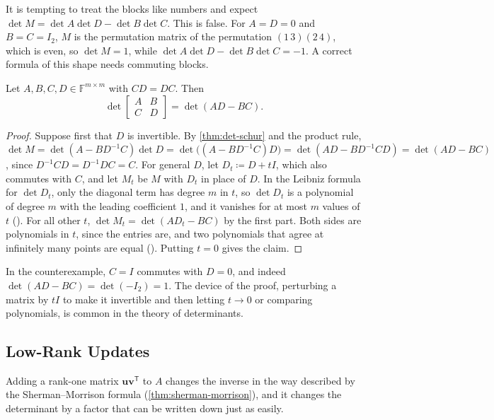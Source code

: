 It is tempting to treat the blocks like numbers and expect $\det M=\det A\det D-\det B\det C$. This is false. For $A=D=0$ and $B=C=I_2$, $M$ is the permutation matrix of the permutation $(1\,3)(2\,4)$, which is even, so $\det M=1$, while $\det A\det D-\det B\det C=-1$. A correct formula of this shape needs commuting blocks.

\begin{proposition}
\label{prop:commuting-blocks}
Let $A,B,C,D\in\mathbb F^{m\times m}$ with $CD=DC$. Then
\[
\det\begin{bmatrix}A&B\\C&D\end{bmatrix}=\det(AD-BC).
\]
\end{proposition}

\begin{proof}
Suppose first that $D$ is invertible. By \cref{thm:det-schur} and the product rule, $\det M=\det(A-BD^{-1}C)\det D=\det\bigl((A-BD^{-1}C)D\bigr)=\det(AD-BD^{-1}CD)=\det(AD-BC)$, since $D^{-1}CD=D^{-1}DC=C$. For general $D$, let $D_t\coloneqq D+tI$, which also commutes with $C$, and let $M_t$ be $M$ with $D_t$ in place of $D$. In the Leibniz formula for $\det D_t$, only the diagonal term has degree $m$ in $t$, so $\det D_t$ is a polynomial of degree $m$ with the leading coefficient $1$, and it vanishes for at most $m$ values of $t$ (). For all other $t$, $\det M_t=\det(AD_t-BC)$ by the first part. Both sides are polynomials in $t$, since the entries are, and two polynomials that agree at infinitely many points are equal (). Putting $t=0$ gives the claim.
\end{proof}

In the counterexample, $C=I$ commutes with $D=0$, and indeed $\det(AD-BC)=\det(-I_2)=1$. The device of the proof, perturbing a matrix by $tI$ to make it invertible and then letting $t\to0$ or comparing polynomials, is common in the theory of determinants.

\subsection{Low-Rank Updates}

Adding a rank-one matrix $\mathbf u\mathbf v^{\mathsf T}$ to $A$ changes the inverse in the way described by the Sherman--Morrison formula (\cref{thm:sherman-morrison}), and it changes the determinant by a factor that can be written down just as easily.

